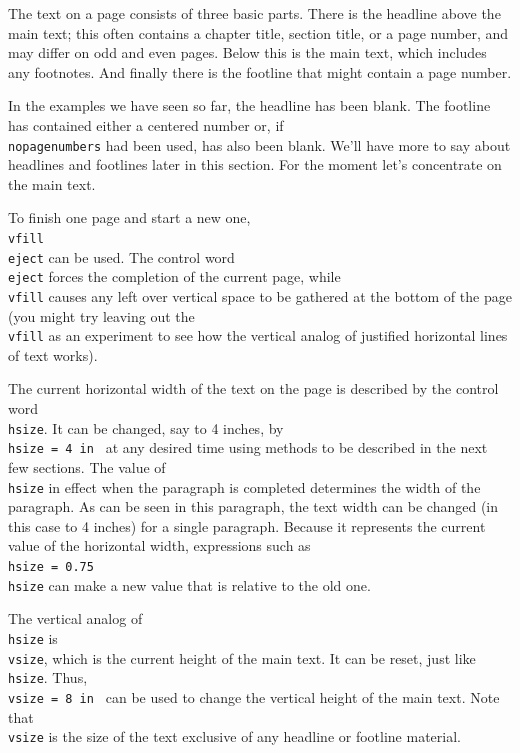 The text on a page consists of three basic parts.  There is the 
headline above the main text; this often contains a chapter 
title, section title, or a page number, and may differ on odd and 
even pages. Below this is the main text, which includes any 
footnotes. And finally there is the footline that might contain a 
page number. 

In the examples we have seen so far, the headline has been blank. 
The footline has contained either a centered{} number or, if {\tt 
\\nopagenumbers} had been used, has also been blank.  We'll have 
more to say about headlines and footlines later in this section. 
For the moment let's concentrate on the main text. 

To finish one page and start a new one, {\tt \\vfill \\eject} can 
be used.  The control word {\tt \\eject} forces the completion of 
the current page, while {\tt \\vfill} causes any left over 
vertical space to be gathered at the bottom of the page (you might 
try leaving out the {\tt \\vfill} as an experiment to see how the 
vertical analog{} of justified horizontal lines of text works). 


{\hsize=4in 
The current horizontal width of the text on the page is described 
by the control word {\tt \\hsize}.  It can be changed, say to 4 
inches, by {\tt \\hsize = 4 in\ } at any desired time using 
methods to be described in the next few sections. The value of 
{\tt \\hsize} in effect when the paragraph is completed 
determines the width of the paragraph. As can be seen in this 
paragraph, the text width can be changed (in this case to 4 
inches) for a single paragraph.  Because it represents the 
current value of the horizontal width, expressions such as {\tt 
 \\hsize = 0.75\\hsize} can make a new value that is relative 
to the old one. \par} 

The vertical analog{} of {\tt \\hsize} is {\tt \\vsize}, which 
is the current height of the main text.  It can be reset, just 
like {\tt \\hsize}.  Thus, {\tt \\vsize = 8 in\ } can be used to 
change the vertical height of the main text. Note that {\tt \\vsize} 
is the size of the text exclusive of any headline or 
footline material. 


